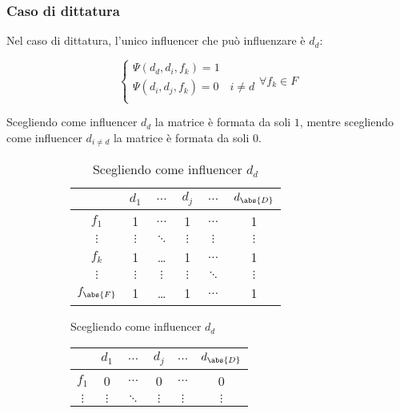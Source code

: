 \documentclass[\main/main.tex]{subfiles}
\begin{document}
\subsubsection{Caso di dittatura}
Nel caso di dittatura, l'unico influencer che può influenzare è $d_d$:

\[
	\begin{cases}
		\Psi(d_d, d_i, f_k) = 1                \\
		\Psi(d_i, d_j, f_k) = 0 \quad i \neq d \\
	\end{cases}
	\forall f_k \in F
\]

Scegliendo come influencer $d_d$ la matrice è formata da soli $1$, mentre scegliendo come influencer $d_{i \neq d}$ la matrice è formata da soli $0$.

\begin{figure}
	\begin{subfigure}{0.48\textwidth}
		\begin{table}
			\begin{tabular}{|c|c|c|c|c|c|}
				\hline
				              & $d_1$    & $\ldots$ & $d_j$    & $\ldots$ & $d_{\abs{D}}$ \\
				\hline
				$f_1$         & 1        & $\ldots$ & 1        & $\ldots$ & 1             \\
				\hline
				$\vdots$      & $\vdots$ & $\ddots$ & $\vdots$ & $\vdots$ & $\vdots$      \\
				\hline
				$f_k$         & 1        & \ldots   & 1        & $\ldots$ & 1             \\
				\hline
				$\vdots$      & $\vdots$ & $\vdots$ & $\vdots$ & $\ddots$ & $\vdots$      \\
				\hline
				$f_{\abs{F}}$ & 1        & \ldots   & 1        & $\ldots$ & 1             \\
				\hline
			\end{tabular}
			\caption{Scegliendo come influencer $d_d$}
		\end{table}
	\end{subfigure}
	\begin{subfigure}{0.48\textwidth}
		\begin{table}
			\begin{tabular}{|c|c|c|c|c|c|}
				\hline
				              & $d_1$    & $\ldots$ & $d_j$    & $\ldots$ & $d_{\abs{D}}$ \\
				\hline
				$f_1$         & 0        & $\ldots$ & 0        & $\ldots$ & 0             \\
				\hline
				$\vdots$      & $\vdots$ & $\ddots$ & $\vdots$ & $\vdots$ & $\vdots$      \\

\end{tabular}
\end{table}
\end{subfigure}
\end{figure}
\end{document}
